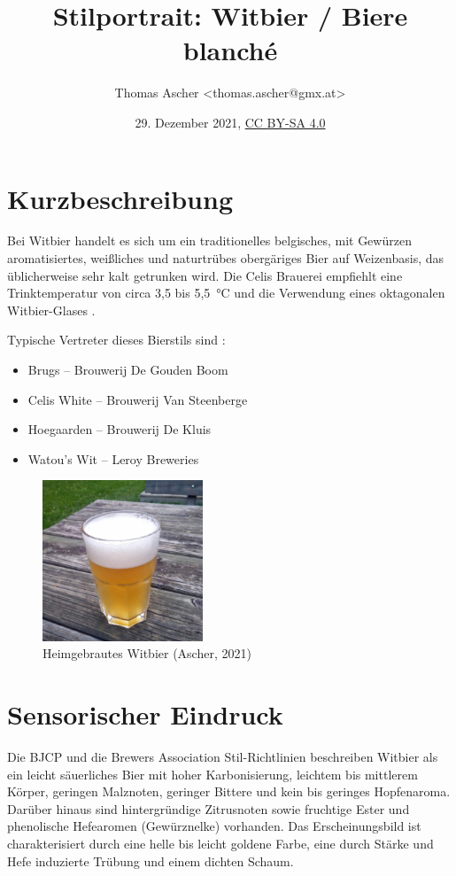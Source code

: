 \documentclass[a4paper,parskip=half]{scrartcl}
\title{Stilportrait: Witbier / Biere blanché}
\author{Thomas Ascher <thomas.ascher@gmx.at>}
\date{29. Dezember 2021, \href{http://creativecommons.org/licenses/by-sa/4.0/}{CC BY-SA 4.0}}
\begin{document}
\maketitle

\section*{Kurzbeschreibung}

Bei Witbier handelt es sich um ein traditionelles belgisches, mit Gewürzen
aromatisiertes, weißliches und naturtrübes obergäriges Bier auf Weizenbasis, das
üblicherweise sehr kalt getrunken wird. \parencite[1\psq]{Strottner1999}
Die Celis Brauerei empfiehlt eine Trinktemperatur von circa 3,5 bis 5,5~°C
und die Verwendung eines oktagonalen Witbier-Glases \parencite{CelisBrewery2021}.

Typische Vertreter dieses Bierstils sind \parencite{Roncoroni2018}:

\begin{itemize}
\item Brugs – Brouwerij De Gouden Boom
\item Celis White – Brouwerij Van Steenberge
\item Hoegaarden – Brouwerij De Kluis
\item Watou's Wit – Leroy Breweries
\end{itemize}

\begin{figure}[h]
\centering
\includegraphics[width=4.8cm]{images/witbier.jpg}
\caption{Heimgebrautes Witbier (Ascher, 2021)}
\label{fig:witbier}
\end{figure}

\section*{Sensorischer Eindruck}

Die BJCP und die Brewers Association Stil-Richtlinien beschreiben
Witbier als ein leicht säuerliches Bier mit hoher Karbonisierung,
leichtem bis mittlerem Körper, geringen Malznoten, geringer Bittere
und kein bis geringes Hopfenaroma. Darüber hinaus sind hintergründige
Zitrusnoten sowie fruchtige Ester und phenolische Hefearomen (Gewürznelke)
vorhanden. Das Erscheinungsbild ist charakterisiert durch eine helle
bis leicht goldene Farbe, eine durch Stärke und Hefe induzierte Trübung
und einem dichten Schaum. \parencites[48\psq]{BJCP2015}[24]{BA2021}
\end{document}
